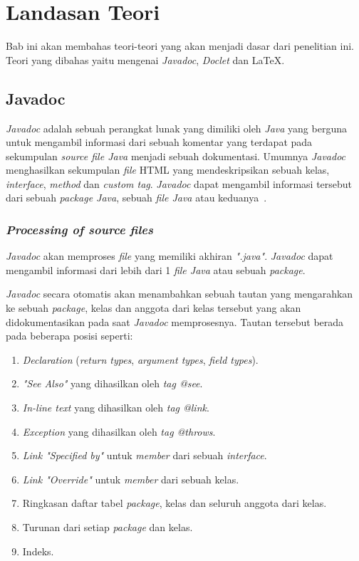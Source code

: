 \lstset{style=mystyle}
\chapter{Landasan Teori}
\label{chap:teori}
Bab ini akan membahas teori-teori yang akan menjadi dasar dari penelitian ini. Teori yang dibahas yaitu mengenai {\it Javadoc}, {\it Doclet} dan \LaTeX .

\section{Javadoc}
\label{sec:javadoc} 
{\it Javadoc} adalah sebuah perangkat lunak yang dimiliki oleh {\it Java} yang berguna untuk mengambil informasi dari sebuah komentar yang terdapat pada sekumpulan {\it source file Java} menjadi sebuah dokumentasi. Umumnya {\it Javadoc} menghasilkan sekumpulan {\it file} HTML yang mendeskripsikan sebuah kelas, {\it interface}, {\it method} dan {\it custom tag}. {\it Javadoc} dapat mengambil informasi tersebut dari sebuah {\it package Java}, sebuah {\it file Java} atau keduanya~\cite{javadoc:01:javadoc}.

\subsection{\textit{Processing of source files}}
\label{sec:javadoc}
{\it Javadoc} akan memproses {\it file} yang memiliki akhiran {\it ".java"}. {\it Javadoc} dapat mengambil informasi dari lebih dari 1 {\it file Java} atau sebuah {\it package}.

{\it Javadoc} secara otomatis akan menambahkan sebuah tautan yang mengarahkan ke sebuah {\it package}, kelas dan anggota dari kelas tersebut yang akan didokumentasikan pada saat {\it Javadoc} memprosesnya. Tautan tersebut berada pada beberapa posisi seperti:
\begin{enumerate}
	\item {\it Declaration} ({\it return types}, {\it argument types}, {\it field types}).
	\item {\it "See Also"} yang dihasilkan oleh {\it tag @see}.
	\item {\it In-line text} yang dihasilkan oleh {\it tag {@link}}.
	\item {\it Exception} yang dihasilkan oleh {\it tag @throws}.
	\item {\it Link "Specified by"} untuk {\it member} dari sebuah {\it interface}.
	\item {\it Link "Override"} untuk {\it member} dari sebuah kelas.
	\item Ringkasan daftar tabel {\it package}, kelas dan seluruh anggota dari kelas.
	\item Turunan dari setiap {\it package} dan kelas.
	\item Indeks.
\end{enumerate}

